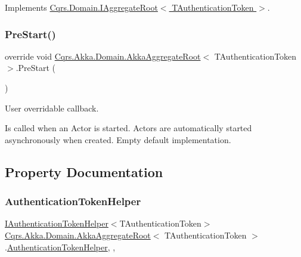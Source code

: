 Implements \hyperlink{interfaceCqrs_1_1Domain_1_1IAggregateRoot_af31116870bbf6566b3eec0b8bc02c6de}{Cqrs.\+Domain.\+I\+Aggregate\+Root$<$ T\+Authentication\+Token $>$}.

\mbox{\label{classCqrs_1_1Akka_1_1Domain_1_1AkkaAggregateRoot_a7da2d3a244e34717ec5af1db8f0042bc}} 
\subsubsection{\texorpdfstring{Pre\+Start()}{PreStart()}}
{\footnotesize\ttfamily override void \hyperlink{classCqrs_1_1Akka_1_1Domain_1_1AkkaAggregateRoot}{Cqrs.\+Akka.\+Domain.\+Akka\+Aggregate\+Root}$<$ T\+Authentication\+Token $>$.Pre\+Start (\begin{DoxyParamCaption}{ }\end{DoxyParamCaption})\hspace{0.3cm}{\ttfamily [protected]}}



User overridable callback. 

Is called when an Actor is started. Actors are automatically started asynchronously when created. Empty default implementation. 



\subsection{Property Documentation}
\mbox{\label{classCqrs_1_1Akka_1_1Domain_1_1AkkaAggregateRoot_a3a73139fe47221bd579949e978d0126d}} 
\subsubsection{\texorpdfstring{Authentication\+Token\+Helper}{AuthenticationTokenHelper}}
{\footnotesize\ttfamily \hyperlink{interfaceCqrs_1_1Authentication_1_1IAuthenticationTokenHelper}{I\+Authentication\+Token\+Helper}$<$T\+Authentication\+Token$>$ \hyperlink{classCqrs_1_1Akka_1_1Domain_1_1AkkaAggregateRoot}{Cqrs.\+Akka.\+Domain.\+Akka\+Aggregate\+Root}$<$ T\+Authentication\+Token $>$.\hyperlink{classCqrs_1_1Authentication_1_1AuthenticationTokenHelper}{Authentication\+Token\+Helper}\hspace{0.3cm}{\ttfamily [get]}, {\ttfamily [set]}, {\ttfamily [protected]}}

